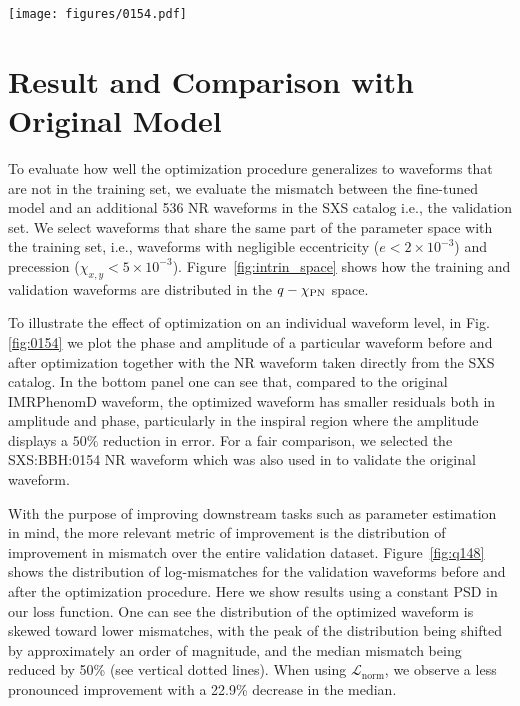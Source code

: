 \documentclass[twocolumn]{aastex631}
\begin{document}
\begin{figure*}[t]
	\centering
	\texttt{[image: figures/0154.pdf]}
	\caption{Comparison between original and optimized IMRPhenomD waveforms.
	Here we show the SXS:BBH:0154 NR waveform, which has a mass ratio of $q=1$ and spins
	$\chi_1=\chi_2=-0.8$. The original mismatch is $2.8\times10^{-4}$ and
	the optimized mismatch is $5.3\times10^{-5}$. \textit{Top}: Here we show the
	amplitude (left) and phase (right) of the NR, original IMRPhenomD, and optimized IMRPhenomD
	waveforms. \textit{Bottom}: Here we show the relative error between the NR and
	IMRPhenomD waveform ampltiudes (left) as well as the absolute error of the phases between the NR and
	IMRPhenomD waveforms (right).}
	\label{fig:0154}
\end{figure*}

\section{Result and Comparison with Original Model} \label{sec:result}


To evaluate how well the optimization procedure generalizes to waveforms that are
not in the training set, we evaluate the mismatch between the fine-tuned model
and an additional 536 NR waveforms in the SXS catalog i.e., the validation set.
We select waveforms that share the same part of the parameter space with the training
set, i.e., waveforms with negligible eccentricity (${e<2\times10^{-3}}$)
and precession (${\chi_{x,y}<5\times10^{-3}}$). Figure~\ref{fig:intrin_space}
shows how the training and validation waveforms are distributed in the
$q-\chi_{\rm PN}$ space.

To illustrate the effect of optimization on an individual waveform level, in Fig.
\ref{fig:0154} we plot the phase and amplitude of a particular waveform before and after optimization together with
the NR waveform taken directly from the SXS catalog. In the bottom panel one can see that,
compared to the original IMRPhenomD waveform, the optimized waveform has smaller residuals both in amplitude and
phase, particularly in the inspiral region where the amplitude displays a
$50\%$ reduction in error. For a fair comparison, we selected the SXS:BBH:0154 NR waveform
which was also used in \citep{khan2016frequency} to validate the original waveform.

With the purpose of improving downstream tasks such as parameter estimation in
mind, the more relevant metric of improvement is the distribution of improvement
in mismatch over the entire validation dataset. Figure~\ref{fig:q148} shows the
distribution of log-mismatches for the validation waveforms before and after the
optimization procedure. Here we show results using a constant PSD in our loss
function. One can see the distribution of the optimized waveform is skewed toward lower mismatches,
with the peak of the distribution being shifted by approximately an order of
magnitude, and the median mismatch being reduced by 50\% (see vertical dotted lines). When using
$\mathcal{L}_{\mathrm{norm}}$, we observe a less pronounced improvement with a 22.9\%
decrease in the median. 
\end{document}

